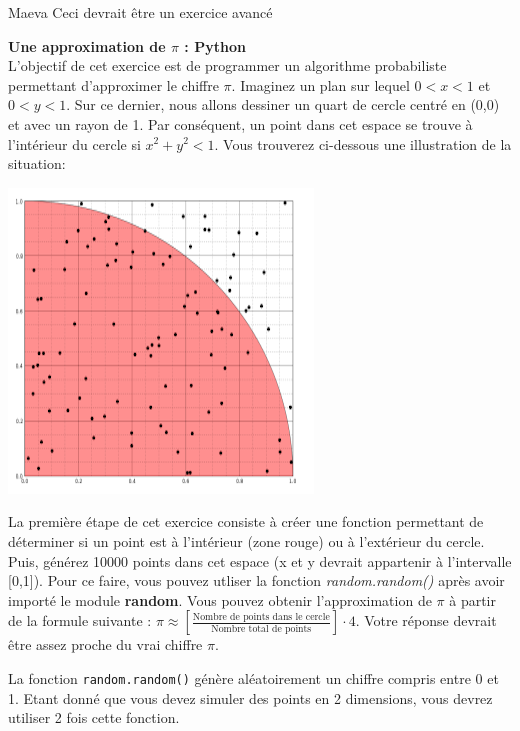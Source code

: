 \begin{note}{Maeva}
    Ceci devrait être un exercice avancé
\end{note}
\begin{Exercice}[20 minutes]\textbf{Une approximation de $\pi$ : Python}\\
L'objectif de cet exercice est de programmer un algorithme probabiliste permettant d'approximer le chiffre $\pi$. Imaginez un plan sur lequel $0 < x < 1$ et $0 < y < 1$. Sur ce dernier, nous allons dessiner un quart de cercle centré en (0,0) et avec un rayon de 1. Par conséquent, un point dans cet espace se trouve à l'intérieur du cercle si $x^2 + y^2 < 1$. Vous trouverez ci-dessous une illustration de la situation:
\begin{center}
\includegraphics[]{Cercle.PNG}
\end{center}
La première étape de cet exercice consiste à créer une fonction permettant de déterminer si un point est à l'intérieur (zone rouge) ou à l'extérieur du cercle. Puis, générez 10000 points dans cet espace (x et y devrait appartenir à l'intervalle [0,1]). Pour ce faire, vous pouvez utliser la fonction \textit{random.random()} après avoir importé le module \textbf{random}. Vous pouvez obtenir l'approximation de $\pi$ à partir de la formule suivante : $\pi \approx [\frac{\text{Nombre de points dans le cercle}}{\text{Nombre total de points}}]\cdot 4$. Votre réponse devrait être assez proche du vrai chiffre $\pi$.\\
\begin{conseil}
    La fonction \lstinline{random.random()} génère aléatoirement un chiffre compris entre 0 et 1. Etant donné que vous devez simuler des points en 2 dimensions, vous devrez utiliser 2 fois cette fonction.
\end{conseil}
\begin{solution}
 
\end{solution}

\end{Exercice}
\newpage
